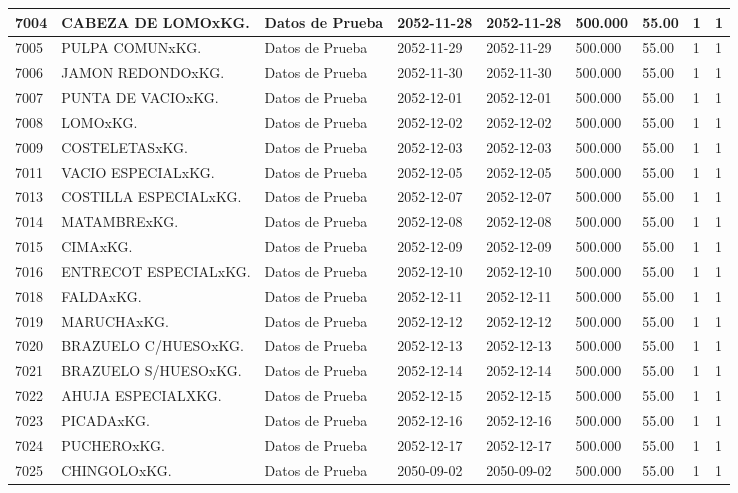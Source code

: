 \documentclass[a4paper,12pt]{article}
\begin{document}
\begin{landscape}
\begin{longtable}{|p{4cm}|p{2.5cm}|p{2.5cm}|p{1.8cm}|p{1.8cm}|p{1cm}|p{1cm}|p{3cm}|p{3cm}||}
7004 & CABEZA DE LOMOxKG. & Datos de Prueba & 2052-11-28 & 2052-11-28 & 500.000 & 55.00 & 1 & 1 \\ \hline 
7005 & PULPA COMUNxKG. & Datos de Prueba & 2052-11-29 & 2052-11-29 & 500.000 & 55.00 & 1 & 1 \\ \hline 
7006 & JAMON REDONDOxKG. & Datos de Prueba & 2052-11-30 & 2052-11-30 & 500.000 & 55.00 & 1 & 1 \\ \hline 
7007 & PUNTA DE VACIOxKG. & Datos de Prueba & 2052-12-01 & 2052-12-01 & 500.000 & 55.00 & 1 & 1 \\ \hline 
7008 & LOMOxKG. & Datos de Prueba & 2052-12-02 & 2052-12-02 & 500.000 & 55.00 & 1 & 1 \\ \hline 
7009 & COSTELETASxKG. & Datos de Prueba & 2052-12-03 & 2052-12-03 & 500.000 & 55.00 & 1 & 1 \\ \hline 
7011 & VACIO ESPECIALxKG. & Datos de Prueba & 2052-12-05 & 2052-12-05 & 500.000 & 55.00 & 1 & 1 \\ \hline 
7013 & COSTILLA ESPECIALxKG. & Datos de Prueba & 2052-12-07 & 2052-12-07 & 500.000 & 55.00 & 1 & 1 \\ \hline 
7014 & MATAMBRExKG. & Datos de Prueba & 2052-12-08 & 2052-12-08 & 500.000 & 55.00 & 1 & 1 \\ \hline 
7015 & CIMAxKG. & Datos de Prueba & 2052-12-09 & 2052-12-09 & 500.000 & 55.00 & 1 & 1 \\ \hline 
7016 & ENTRECOT ESPECIALxKG. & Datos de Prueba & 2052-12-10 & 2052-12-10 & 500.000 & 55.00 & 1 & 1 \\ \hline 
7018 & FALDAxKG. & Datos de Prueba & 2052-12-11 & 2052-12-11 & 500.000 & 55.00 & 1 & 1 \\ \hline 
7019 & MARUCHAxKG. & Datos de Prueba & 2052-12-12 & 2052-12-12 & 500.000 & 55.00 & 1 & 1 \\ \hline 
7020 & BRAZUELO C/HUESOxKG. & Datos de Prueba & 2052-12-13 & 2052-12-13 & 500.000 & 55.00 & 1 & 1 \\ \hline 
7021 & BRAZUELO S/HUESOxKG. & Datos de Prueba & 2052-12-14 & 2052-12-14 & 500.000 & 55.00 & 1 & 1 \\ \hline 
7022 & AHUJA ESPECIALXKG. & Datos de Prueba & 2052-12-15 & 2052-12-15 & 500.000 & 55.00 & 1 & 1 \\ \hline 
7023 & PICADAxKG. & Datos de Prueba & 2052-12-16 & 2052-12-16 & 500.000 & 55.00 & 1 & 1 \\ \hline 
7024 & PUCHEROxKG. & Datos de Prueba & 2052-12-17 & 2052-12-17 & 500.000 & 55.00 & 1 & 1 \\ \hline 
7025 & CHINGOLOxKG. & Datos de Prueba & 2050-09-02 & 2050-09-02 & 500.000 & 55.00 & 1 & 1 \\ \hline 

\end{longtable}
\end{landscape}
\end{document}

